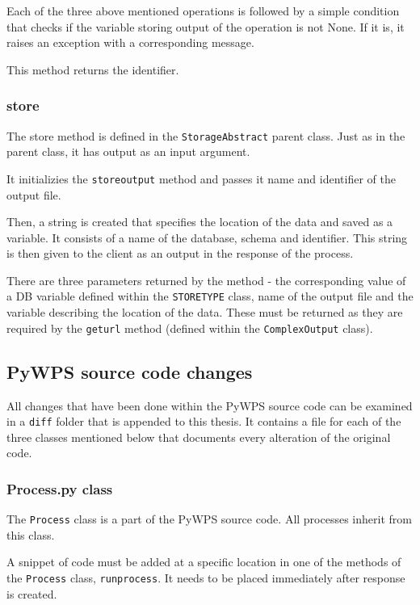 Each of the three above mentioned operations is followed by a simple condition that checks if the variable storing output of the operation is not None. If it is, it raises an exception with a corresponding message.

This method returns the identifier.


\subsubsection{store} 

The store method is defined in the \texttt{StorageAbstract} parent class. Just as in the parent class, it has output as an input argument.

It initializies the \texttt{\textunderscore  store\textunderscore output} method and passes it name and identifier of the output file. 

Then, a string is created that specifies the location of the data and saved as a variable. It consists of a name of the database, schema and identifier. This string is then given to the client as an output in the  response of the process.

There are three parameters returned by the method - the corresponding value of a DB variable defined within the \texttt{STORE\textunderscore TYPE} class, name of the output file and the variable describing the location of the data. These must be returned as they are required by the \texttt{get\textunderscore url} method (defined within the \texttt{ComplexOutput} class). 


\subsection{PyWPS source code changes} 

All changes that have been done within the PyWPS source code can be examined in a \texttt{diff} folder that is appended to this thesis. It contains a file for each of the three classes mentioned below that documents every alteration of the original code.

\subsubsection{Process.py class} 

The \texttt{Process} class is a part of the PyWPS source code. All processes inherit from this class. 

A snippet of code must be added at a specific location in one of the methods of the \texttt{Process} class, \texttt{\textunderscore run\textunderscore process}. It needs to be placed immediately after response is created.

